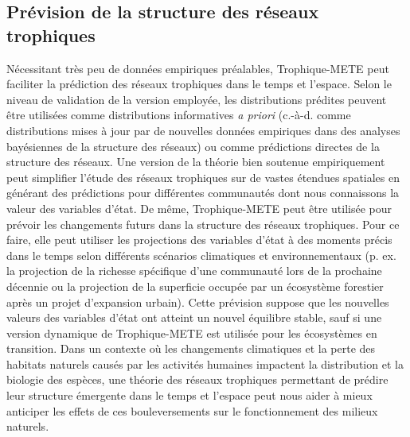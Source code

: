 \subsection{Prévision de la structure des réseaux trophiques} 

Nécessitant très peu de données empiriques préalables, Trophique-METE peut
faciliter la prédiction des réseaux trophiques dans le temps et l'espace. Selon
le niveau de validation de la version employée, les distributions prédites
peuvent être utilisées comme distributions informatives \textit{a priori}
(c.-à-d. comme distributions mises à jour par de nouvelles données empiriques
dans des analyses bayésiennes de la structure des réseaux) ou comme prédictions
directes de la structure des réseaux. Une version de la théorie bien soutenue
empiriquement peut simplifier l'étude des réseaux trophiques sur de vastes
étendues spatiales en générant des prédictions pour différentes communautés dont
nous connaissons la valeur des variables d'état. De même, Trophique-METE peut
être utilisée pour prévoir les changements futurs dans la structure des réseaux
trophiques. Pour ce faire, elle peut utiliser les projections des variables
d'état à des moments précis dans le temps selon différents scénarios climatiques
et environnementaux (p. ex. la projection de la richesse spécifique d'une
communauté lors de la prochaine décennie ou la projection de la superficie
occupée par un écosystème forestier après un projet d'expansion urbain). Cette
prévision suppose que les nouvelles valeurs des variables d'état ont atteint un
nouvel équilibre stable, sauf si une version dynamique de Trophique-METE est
utilisée pour les écosystèmes en transition. Dans un contexte où les changements
climatiques et la perte des habitats naturels causés par les activités humaines
impactent la distribution et la biologie des espèces, une théorie des réseaux
trophiques permettant de prédire leur structure émergente dans le temps et
l'espace peut nous aider à mieux anticiper les effets de ces bouleversements sur
le fonctionnement des milieux naturels.

\endinput
